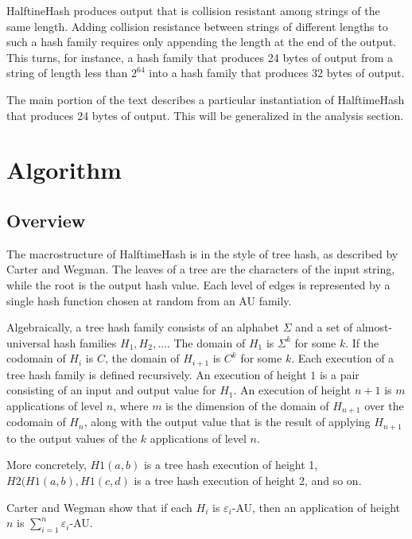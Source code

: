 \documentclass[acmsmall, nonacm]{acmart}
\begin{document}
HalftineHash produces output that is collision resistant among strings of the same length.
Adding collision resistance between strings of different lengths to such a hash family requires only appending the length at the end of the output.
This turns, for instance, a hash family that produces 24 bytes of output from a string of length less than $2^64$ into a hash family that produces 32 bytes of output.

The main portion of the text describes a particular instantiation of HalftimeHash that produces 24 bytes of output.
This will be generalized in the analysis section.

\section{Algorithm}
\label{algo}

\subsection{Overview}

The macrostructure of HalftimeHash is in the style of tree hash, as described by Carter and Wegman. \cite{carter-wegman-79}
The leaves of a tree are the characters of the input string, while the root is the output hash value.
Each level of edges is represented by a single hash function chosen at random from an AU family.

Algebraically, a tree hash family consists of an alphabet $\Sigma$ and a set of almost-universal hash families $H_1, H_2, \dots$.
The domain of $H_1$ is $\Sigma^k$ for some $k$.
If the codomain of $H_i$ is $C$, the domain of $H_{i+1}$ is $C^k$ for some $k$.
Each execution of a tree hash family is defined recursively.
An execution of height $1$ is a pair consisting of an input and output value for $H_1$.
An execution of height $n+1$ is $m$ applications of level $n$, where $m$ is the dimension of the domain of $H_{n+1}$ over the codomain of $H_n$, along with the output value that is the result of applying $H_{n+1}$ to the output values of the $k$ applications of level $n$.

More concretely, $H1(a,b)$ is a tree hash execution of height 1, $H2(H1(a,b), H1(c,d)$ is a tree hash execution of height 2, and so on.

Carter and Wegman show that if each $H_i$ is $\varepsilon_i$-AU, then an application of height $n$ is $\sum_{i=1}^n \varepsilon_i$-AU.
\end{document}
